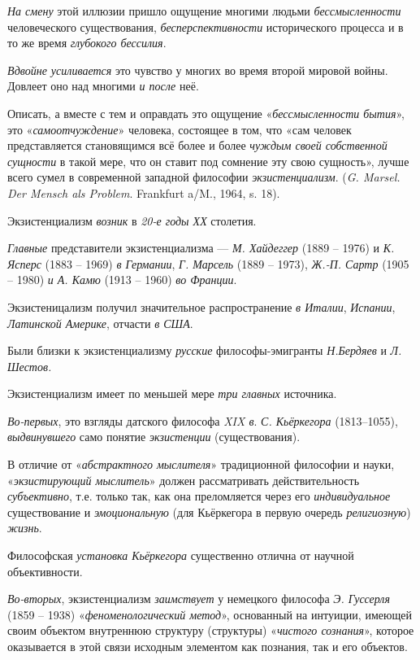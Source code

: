 \documentclass[a4paper,14pt,russian]{extreport}
\begin{document}
\emph{На смену} этой иллюзии пришло ощущение многими людьми \emph{бессмысленности} человеческого существования, \emph{бесперспективности} исторического процесса и в то же время \emph{глубокого бессилия}.

\emph{Вдвойне усиливается} это чувство у многих во время второй мировой войны. Довлеет оно над многими \emph{и после} неё.

Описать, а вместе с тем и оправдать это ощущение «\emph{бессмысленности бытия}», это «\emph{самоотчуждение}» человека, состоящее в том, что «сам человек представляется становящимся всё более и более \emph{чуждым своей собственной сущности} в такой мере, что он ставит под сомнение эту свою сущность», лучше всего сумел в современной западной философии \emph{экзистенциализм}. (\emph{G. Marsel. Der Mensch als Problem}. Frankfurt a/M., 1964, s. 18).

Экзистенциализм \emph{возник} в \emph{20-е годы ХХ} столетия.

\emph{Главные} представители экзистенциализма --- \emph{М. Хайдеггер} (1889 -- 1976) и \emph{К. Ясперс} (1883 -- 1969) \emph{в Германии}, \emph{Г. Марсель} (1889 -- 1973), \emph{Ж.-П. Сартр} (1905 -- 1980) \emph{и А. Камю} (1913 -- 1960) \emph{во Франции}.

Экзистеницализм получил значительное распространение \emph{в Италии}, \emph{Испании}, \emph{Латинской Америке}, отчасти \emph{в США}.

Были близки к экзистенциализму \emph{русские} философы-эмигранты \emph{Н.Бердяев} и \emph{Л. Шестов.}

Экзистенциализм имеет по меньшей мере \emph{три главных} источника.

\emph{Во-первых}, это взгляды датского философа \emph{XIX в}. \emph{С. Кьёркегора} (1813--1055), \emph{выдвинувшего} само понятие \emph{экзистенции} (существования).

В отличие от «\emph{абстрактного мыслителя}» традиционной философии и науки, «\emph{экзистирующий мыслитель}» должен рассматривать действительность \emph{субъективно}, т.е. только так, как она преломляется через его \emph{индивидуальное} существование и \emph{эмоциональную} (для Кьёркегора в первую очередь \emph{религиозную}) \emph{жизнь}.

Философская \emph{установка Кьёркегора} существенно отлична от научной объективности.

\emph{Во-вторых}, экзистенциализм \emph{заимствует} у немецкого философа \emph{Э. Гуссерля} (1859 -- 1938) «\emph{феноменологический метод}», основанный на интуиции, имеющей своим объектом внутреннюю структуру (структуры) «\emph{чистого сознания}», которое оказывается в этой связи исходным элементом как познания, так и его объектов.
\end{document}
